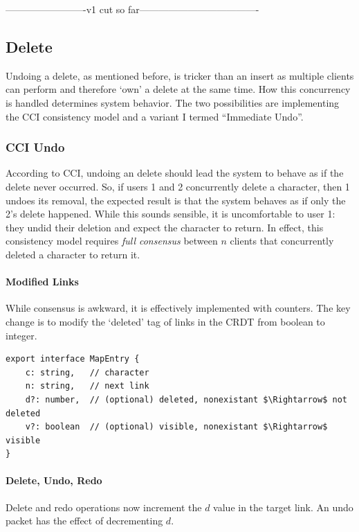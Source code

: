 \documentclass[12pt,a4paper,twoside,openright]{report}
\begin{document}
-------------------------v1 cut so far-------------------------------------
		
	\subsection{Delete}
		Undoing a delete, as mentioned before, is tricker than an insert as multiple clients can perform and therefore `own' a delete at the same time. How this concurrency is handled determines system behavior. The two possibilities are implementing the CCI consistency model and a variant I termed ``Immediate Undo''.
		
		\subsubsection{CCI Undo} \label{sec:cciundo}
		According to CCI, undoing an delete should lead the system to behave as if the delete never occurred. So, if users 1 and 2 concurrently delete a character, then 1 undoes its removal, the expected result is that the system behaves as if only the 2's delete happened. While this sounds sensible, it is uncomfortable to user 1: they undid their deletion and expect the character to return. In effect, this consistency model requires \textit{full consensus} between $n$ clients that concurrently deleted a character to return it.
		
			\paragraph{Modified Links}
			While consensus is awkward, it is effectively implemented with counters. The key change is to modify the `deleted' tag of links in the CRDT from boolean to integer.
			
\begin{lstlisting}[caption={New Type Signature of a Link in the CRDT}, mathescape=true]
export interface MapEntry {
	c: string,   // character
	n: string,   // next link
	d?: number,  // (optional) deleted, nonexistant $\Rightarrow$ not deleted
	v?: boolean  // (optional) visible, nonexistant $\Rightarrow$ visible
}
\end{lstlisting}

			\paragraph{Delete, Undo, Redo}
			Delete and redo operations now increment the $d$ value in the target link. An undo packet has the effect of decrementing $d$.
			
\end{document}

